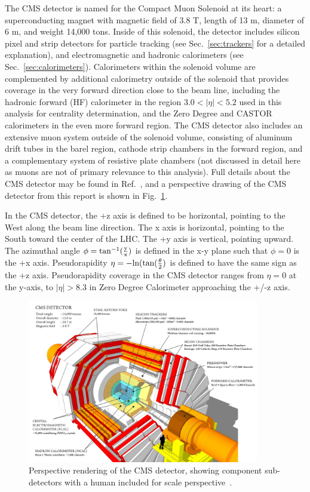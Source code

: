 The CMS detector is named for the Compact Muon Solenoid at its heart:  a superconducting magnet with magnetic field of 3.8 T, length of 13 m, diameter of 6 m, and weight 14,000 tons.  Inside of this solenoid, the detector includes silicon pixel and strip detectors for particle tracking (see Sec.~\ref{sec:trackers} for a detailed explanation), and electromagnetic and hadronic calorimeters (see Sec.~\ref{sec:calorimeters}).  Calorimeters within the solenoid volume are complemented by additional calorimetry outside of the solenoid that provides coverage in the very forward direction close to the beam line, including the hadronic forward (HF) calorimeter in the region $3.0 < |\eta| < 5.2$ used in this analysis for centrality determination, and the Zero Degree and CASTOR calorimeters in the even more forward region.  The CMS detector also includes an extensive muon system outside of the solenoid volume, consisting of aluminum drift tubes in the barel region, cathode strip chambers in the forward region, and a complementary system of resistive plate chambers (not discussed in detail here as muons are not of primary relevance to this analysis).  Full details about the CMS detector may be found in Ref.~\cite{Chatrchyan:2008zzk}, and a perspective drawing of the CMS detector from this report is shown in Fig.~\ref{fig:detector}.

In the CMS detector, the +z axis is defined to be horizontal, pointing to the West along the beam line direction.  The x axis is horizontal, pointing to the South toward the center of the LHC.  The +y axis is vertical, pointing upward.  The azimuthal angle $\phi = \rm tan^{-1}(\frac{y}{x})$ is defined in the x-y plane such that $\phi = 0$ is the +x axis.  Pseudorapidity $\eta = \rm -ln(tan(\frac{\theta}{2})$ is defined to have the same sign as the +z axis.  Pseudorapidity coverage in the CMS detector ranges from $\eta = 0$ at the y-axis, to $|\eta| > 8.3$ in Zero Degree Calorimeter approaching the +/-z axis.

\begin{figure}[hbtp]
\begin{center}
\includegraphics[width=0.9\textwidth]{figures/Detector/Detector.png}
\caption[CMS detector perspective drawing]{Perspective rendering of the CMS detector, showing component sub-detectors with a human included for scale perspective~\cite{SketchUp}.}
\label{fig:detector}
\end{center}
\end{figure}

